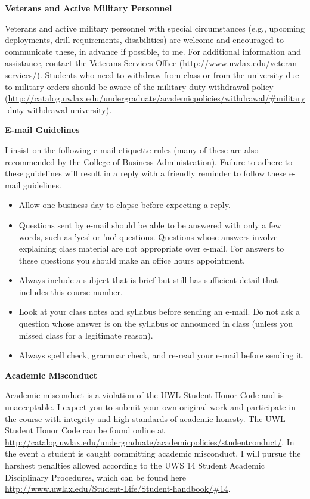 \documentclass[10pt]{article}
\newcommand{\bulurl}[1]{\url{#1}}
\newcommand{\bi}{\begin{itemize}}
\newcommand{\ei}{\end{itemize}}
\newcommand{\toprule}{\par\vspace*{5pt}\noindent{\hrule\hfill}\par\vspace*{1pt}}
\newcommand{\botrule}{\par\noindent{\hrule\hfill}\par}
\begin{document}
\botrule \textbf{Veterans and Active Military Personnel} \toprule
Veterans and active military personnel with special circumstances (e.g., upcoming deployments, drill requirements, disabilities) are welcome and encouraged to communicate these, in advance if possible, to me. For additional information and assistance, contact the \href{http://www.uwlax.edu/veteran-services/}{Veterans Services Office} (\bulurl{http://www.uwlax.edu/veteran-services/}). Students who need to withdraw from class or from the university due to military orders should be aware of the \href{http://catalog.uwlax.edu/undergraduate/academicpolicies/withdrawal/\#military-duty-withdrawal-university}{military duty withdrawal policy} (\bulurl{http://catalog.uwlax.edu/undergraduate/academicpolicies/withdrawal/\#military-duty-withdrawal-university}).\\

\botrule \textbf{E-mail Guidelines} \toprule
I insist on the following e-mail etiquette rules (many of these are also recommended by the College of Business Administration).  Failure to adhere to these guidelines will result in a reply with a friendly reminder to follow these e-mail guidelines.
\bi
\item Allow one business day to elapse before expecting a reply. 
\item Questions sent by e-mail should be able to be answered with only a few words, such as 'yes' or 'no' questions.  Questions whose answers involve explaining class material are not appropriate over e-mail.  For answers to these questions you should make an office hours appointment.
\item Always include a subject that is brief but still has sufficient detail that includes this course number.
\item Look at your class notes and syllabus before sending an e-mail.  Do not ask a question whose answer is on the syllabus or announced in class (unless you missed class for a legitimate reason).
\item Always spell check, grammar check, and re-read your e-mail before sending it.
  \ei

\botrule \textbf{Academic Misconduct} \toprule
Academic misconduct is a violation of the UWL Student Honor Code and is unacceptable. I expect you to submit your own original work and participate in the course with integrity and high standards of academic honesty.  The UWL Student Honor Code can be found online at \bulurl{http://catalog.uwlax.edu/undergraduate/academicpolicies/studentconduct/}.  In the event a student is caught committing academic misconduct, I will pursue the harshest penalties allowed according to the UWS 14 Student Academic Disciplinary Procedures, which can be found here \bulurl{http://www.uwlax.edu/Student-Life/Student-handbook/\#14}.\\
\end{document}

